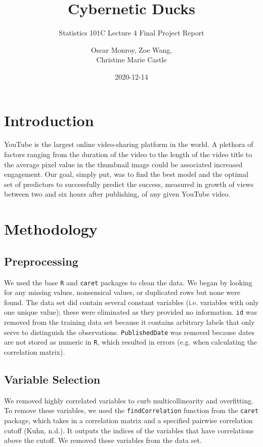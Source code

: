 \documentclass{scrartcl}
\title{Cybernetic Ducks}
\subtitle{Statistics 101C Lecture 4 Final Project Report}
\author{Oscar Monroy, Zoe Wang,\\Christine Marie Castle}
\date{2020-12-14}
\begin{document}
\maketitle

\section{Introduction}

\quad YouTube is the largest online video-sharing platform in the world. A plethora of factors ranging from the duration of the video to the length of the video title to the average pixel value in the thumbnail image could be associated increased engagement. Our goal, simply put, was to find the best model and the optimal set of predictors to successfully predict the success, measured in growth of views between two and six hours after publishing, of any given YouTube video.

\section{Methodology}

\subsection{Preprocessing}

\quad We used the base \verb|R| and \verb|caret| packages to clean the data. We began by looking for any missing values, nonsensical values, or duplicated rows but none were found. The data set did contain several constant variables (i.e. variables with only one unique value); these were eliminated as they provided no information. \verb|id| was removed from the training data set because it contains arbitrary labels that only serve to distinguish the observations. \verb|PublishedDate| was removed because dates are not stored as numeric in \verb|R|, which resulted in errors (e.g. when calculating the correlation matrix).

\subsection{Variable Selection}

\quad We removed highly correlated variables to curb multicollinearity and overfitting. To remove these variables, we used the \verb|findCorrelation| function from the \verb|caret| package, which takes in a correlation matrix and a specified pairwise correlation cutoff (Kuhn, n.d.). It outputs the indices of the variables that have correlations above the cutoff. We removed these variables from the data set.
\end{document}

